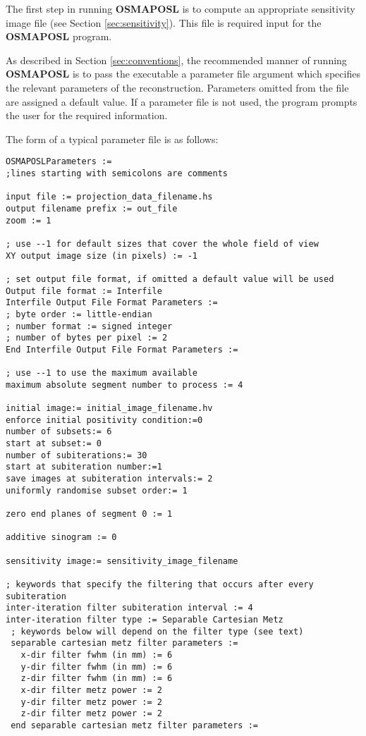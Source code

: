 \documentclass{article}
\begin{document}
The first step in running \textbf{OSMAPOSL} is to compute an appropriate 
sensitivity image file (see Section \ref{sec:sensitivity}). This file is required 
input for the \textbf{OSMAPOSL} program.


As described in Section \ref{sec:conventions}, 
the recommended manner of running \textbf{OSMAPOSL} 
is to pass the executable a parameter file argument which specifies 
the relevant parameters of the reconstruction. Parameters omitted 
from the file are assigned a default value. If a parameter file 
is not used, the program prompts the user for the required information. 



The form of a typical parameter file is as follows:

\begin{verbatim}
OSMAPOSLParameters :=
;lines starting with semicolons are comments

input file := projection_data_filename.hs
output filename prefix := out_file
zoom := 1

; use --1 for default sizes that cover the whole field of view
XY output image size (in pixels) := -1

; set output file format, if omitted a default value will be used
Output file format := Interfile 
Interfile Output File Format Parameters := 
; byte order := little-endian 
; number format := signed integer 
; number of bytes per pixel := 2 
End Interfile Output File Format Parameters :=

; use --1 to use the maximum available
maximum absolute segment number to process := 4

initial image:= initial_image_filename.hv
enforce initial positivity condition:=0
number of subsets:= 6
start at subset:= 0
number of subiterations:= 30
start at subiteration number:=1
save images at subiteration intervals:= 2
uniformly randomise subset order:= 1

zero end planes of segment 0 := 1

additive sinogram := 0

sensitivity image:= sensitivity_image_filename

; keywords that specify the filtering that occurs after every 
subiteration
inter-iteration filter subiteration interval := 4
inter-iteration filter type := Separable Cartesian Metz
 ; keywords below will depend on the filter type (see text)
 separable cartesian metz filter parameters := 
   x-dir filter fwhm (in mm) := 6 
   y-dir filter fwhm (in mm) := 6 
   z-dir filter fwhm (in mm) := 6 
   x-dir filter metz power := 2 
   y-dir filter metz power := 2 
   z-dir filter metz power := 2 
 end separable cartesian metz filter parameters := 



\end{verbatim}
\end{document}

